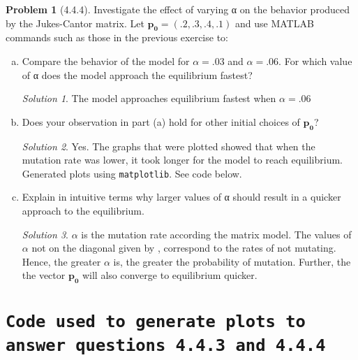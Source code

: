 \documentclass[11pt]{article}
\theoremstyle{definition}\newtheorem*{problem}{Problem}
\theoremstyle{remark}\newtheorem{claim}{Claim}
\theoremstyle{remark}\newtheorem*{sol}{Solution}
\begin{document}
\begin{problem}[4.4.4] Investigate the effect of varying α on the behavior produced by the Jukes-Cantor matrix. Let $\mathbf {p_0}=(.2,.3,.4,.1)$ and use MATLAB commands such as those in the previous exercise to:
\end{problem}
\begin{enumerate}[a.]
\item Compare the behavior of the model for $\alpha = .03$ and $\alpha = .06$. For which value of α does the model approach the equilibrium fastest?
\begin{sol}
The model approaches equilibrium fastest when $\alpha = .06$
\end{sol}

\item Does your observation in part (a) hold for other initial choices of $\mathbf {p_0}$? 
\begin{sol}
Yes. The graphs that were plotted showed that when the mutation rate was lower, it took longer for the model to reach equilibrium. Generated plots using \texttt{matplotlib}. See code below.

\end{sol}

\item Explain in intuitive terms why larger values of α should result in a quicker approach to the equilibrium.
\begin{sol}
$\alpha$ is the mutation rate according the matrix model. The values of $\alpha$ not on the diagonal given by   , correspond to the rates of not mutating. Hence, the greater $\alpha$ is, the greater the probability of mutation. Further, the the vector $\mathbf {p_0}$ will also converge to equilibrium quicker.
\end{sol}
\end{enumerate}

\section{\texttt {Code used to generate plots to answer questions 4.4.3 and 4.4.4}}



\end{document}
